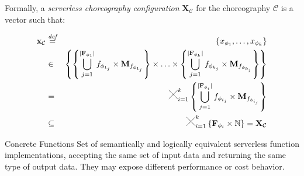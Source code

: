 \documentclass[13.5pt]{beamer}
\newcommand{\Cross}{\mathbin{\tikz [x=2.5ex,y=2.5ex,line width=.10ex] \draw (0,0) -- (1,1) (0,1) -- (1,0);}}
\newcommand{\mathDef}{\overset{\textit{def}}{=}}
\begin{document}
\begin{frame}
	Formally, a \textit{serverless choreography configuration} $\textbf{X}_{\mathcal{C}}$ for the choreography $\mathcal{C}$ is a vector such that:
	
	\begin{eqnarray}
		\textbf{x}_{\mathcal{C}} & \mathDef & \left\lbrace x_{\phi_{1}}, \ldots, x_{\phi_{k}} \right\rbrace \nonumber \\ 
		& \in & \left\{  \left\{ \bigcup_{j=1}^{|\textbf{F}_{\phi_{1}}|} f_{\phi_{1_j}} \times \textbf{M}_{f_{\phi_{1_j}}} \right\} \times \ldots \times \left\{ \bigcup_{j=1}^{|\textbf{F}_{\phi_{k}}|} f_{\phi_{k_j}} \times \textbf{M}_{f_{\phi_{k_j}}} \right\} \right\}  \nonumber \\
		& = & \Cross_{i = 1}^k \left\{ \bigcup_{j=1}^{|\textbf{F}_{\phi_{i}}|} f_{\phi_{i_j}} \times \textbf{M}_{f_{\phi_{i_j}}} \right\} \nonumber \\
		& \subseteq & \Cross_{i = 1}^k \left\{ \textbf{F}_{\phi_{i}} \times \mathbb{N} \right\} = \textbf{X}_{\mathcal{C}}
	\end{eqnarray}

	\begin{block}{Concrete Functions}
		\centering
		Set of semantically and logically equivalent serverless function implementations, accepting the same set of input data and returning the same type of output data. They may expose different performance or cost behavior.
	\end{block}

\end{frame}



\end{document}
